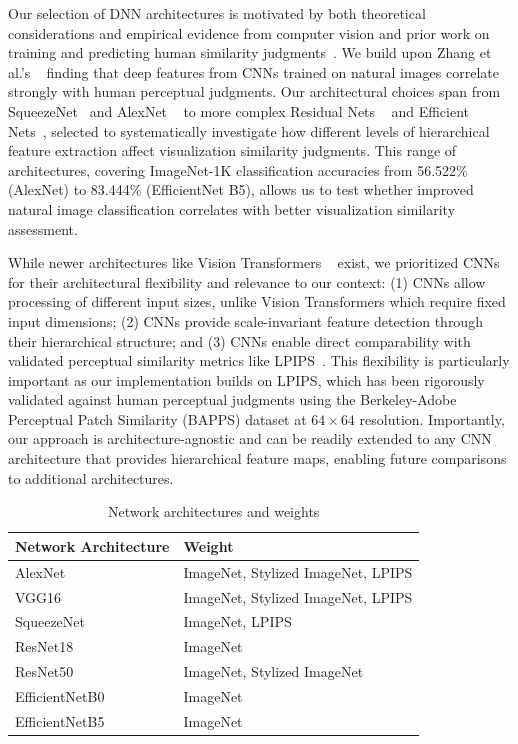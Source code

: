 \documentclass[sigconf]{acmart}
\begin{document}
Our selection of DNN architectures is motivated by both theoretical considerations and empirical evidence from computer vision and prior work on training and predicting human similarity judgments~\cite{yang2023can}. We build upon Zhang et al.'s ~\cite{zhangUnreasonableEffectivenessDeep2018} finding that deep features from CNNs trained on natural images correlate strongly with human perceptual judgments. Our architectural choices span from SqueezeNet~\cite{iandola2016squeezenet} and AlexNet ~\cite{krizhevsky2012imagenet} to more complex Residual Nets ~\cite{he2016deep} and Efficient Nets~\cite{tan2019efficientnet}, selected to systematically investigate how different levels of hierarchical feature extraction affect visualization similarity judgments. This range of architectures, covering ImageNet-1K classification accuracies from 56.522\% (AlexNet) to 83.444\% (EfficientNet B5), allows us to test whether improved natural image classification correlates with better visualization similarity assessment. 

While newer architectures like Vision Transformers ~\cite{dosovitskiyImageWorth16x162021} exist, we prioritized CNNs for their architectural flexibility and relevance to our context: (1) CNNs allow processing of different input sizes, unlike Vision Transformers which require fixed input dimensions; (2) CNNs provide scale-invariant feature detection through their hierarchical structure; and (3) CNNs enable direct comparability with validated perceptual similarity metrics like LPIPS~\cite{zhangUnreasonableEffectivenessDeep2018}. This flexibility is particularly important as our implementation builds on LPIPS, which has been rigorously validated against human perceptual judgments using the Berkeley-Adobe Perceptual Patch Similarity (BAPPS) dataset at $64\times64$ resolution. Importantly, our approach is architecture-agnostic and can be readily extended to any CNN architecture that provides hierarchical feature maps, enabling future comparisons to additional architectures.

\begin{table}[!htbp]
    \centering
    \caption{Network architectures and weights}
    \begin{tabular}{l l}
        \toprule
        \textbf{Network Architecture} & \textbf{Weight} \\
        \midrule 
        AlexNet \cite{krizhevsky2012imagenet} & ImageNet, Stylized ImageNet, LPIPS \\ 
        VGG16 \cite{simonyan2014very} & ImageNet, Stylized ImageNet, LPIPS\\ 
        SqueezeNet \cite{iandola2016squeezenet} & ImageNet, LPIPS\\ 
        ResNet18 \cite{he2016deep} & ImageNet \\ 
        ResNet50 \cite{he2016deep} & ImageNet, Stylized ImageNet\\ 
        EfficientNetB0 \cite{tan2019efficientnet} & ImageNet  \\ 
        EfficientNetB5 \cite{tan2019efficientnet} & ImageNet \\ 
        \bottomrule
    \end{tabular}
    \label{tab:architecture_and_weights}
\end{table}
\end{document}
